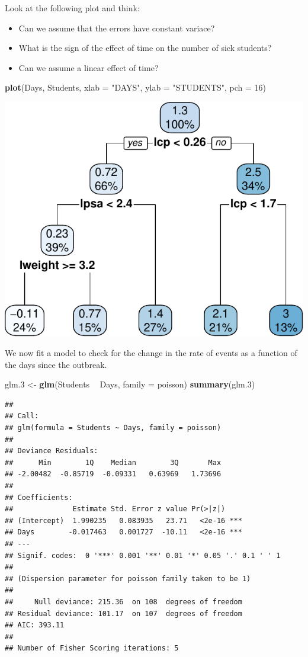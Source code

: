 \documentclass[]{book}
\newenvironment{Shaded}{\begin{snugshade}}{\end{snugshade}}
\newcommand{\KeywordTok}[1]{\textcolor[rgb]{0.13,0.29,0.53}{\textbf{#1}}}
\newcommand{\DataTypeTok}[1]{\textcolor[rgb]{0.13,0.29,0.53}{#1}}
\newcommand{\DecValTok}[1]{\textcolor[rgb]{0.00,0.00,0.81}{#1}}
\newcommand{\StringTok}[1]{\textcolor[rgb]{0.31,0.60,0.02}{#1}}
\newcommand{\OperatorTok}[1]{\textcolor[rgb]{0.81,0.36,0.00}{\textbf{#1}}}
\newcommand{\NormalTok}[1]{#1}
\providecommand{\tightlist}{%
  \setlength{\itemsep}{0pt}\setlength{\parskip}{0pt}}
\theoremstyle{definition}
\theoremstyle{definition}
\theoremstyle{definition}
\theoremstyle{remark}
\begin{document}
Look at the following plot and think:

\begin{itemize}
\tightlist
\item
  Can we assume that the errors have constant variace?
\item
  What is the sign of the effect of time on the number of sick students?
\item
  Can we assume a linear effect of time?
\end{itemize}

\begin{Shaded}
\begin{Highlighting}[]
\KeywordTok{plot}\NormalTok{(Days, Students, }\DataTypeTok{xlab =} \StringTok{"DAYS"}\NormalTok{, }\DataTypeTok{ylab =} \StringTok{"STUDENTS"}\NormalTok{, }\DataTypeTok{pch =} \DecValTok{16}\NormalTok{)}
\end{Highlighting}
\end{Shaded}

\includegraphics[width=0.5\linewidth]{Rcourse_files/figure-latex/unnamed-chunk-193-1}

We now fit a model to check for the change in the rate of events as a
function of the days since the outbreak.

\begin{Shaded}
\begin{Highlighting}[]
\NormalTok{glm.}\DecValTok{3}\NormalTok{ <-}\StringTok{ }\KeywordTok{glm}\NormalTok{(Students }\OperatorTok{~}\StringTok{ }\NormalTok{Days, }\DataTypeTok{family =}\NormalTok{ poisson)}
\KeywordTok{summary}\NormalTok{(glm.}\DecValTok{3}\NormalTok{)}
\end{Highlighting}
\end{Shaded}

\begin{verbatim}
## 
## Call:
## glm(formula = Students ~ Days, family = poisson)
## 
## Deviance Residuals: 
##      Min        1Q    Median        3Q       Max  
## -2.00482  -0.85719  -0.09331   0.63969   1.73696  
## 
## Coefficients:
##              Estimate Std. Error z value Pr(>|z|)    
## (Intercept)  1.990235   0.083935   23.71   <2e-16 ***
## Days        -0.017463   0.001727  -10.11   <2e-16 ***
## ---
## Signif. codes:  0 '***' 0.001 '**' 0.01 '*' 0.05 '.' 0.1 ' ' 1
## 
## (Dispersion parameter for poisson family taken to be 1)
## 
##     Null deviance: 215.36  on 108  degrees of freedom
## Residual deviance: 101.17  on 107  degrees of freedom
## AIC: 393.11
## 
## Number of Fisher Scoring iterations: 5
\end{verbatim}
\end{document}
